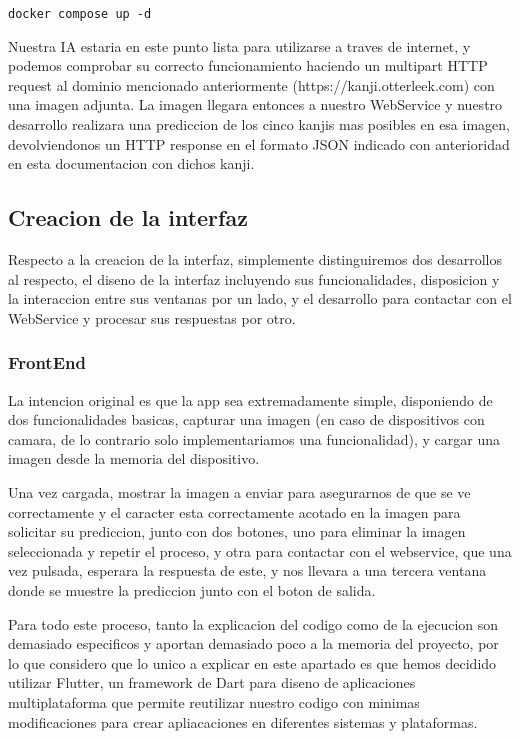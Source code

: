 \documentclass{article}
\begin{document}
\noindent\begin{minipage}{\textwidth}
\begin{lstlisting}[numbers=none]
docker compose up -d
\end{lstlisting}
\end{minipage}
Nuestra IA estaria en este punto lista para utilizarse a traves de internet, y podemos comprobar su correcto funcionamiento haciendo un multipart HTTP request al dominio mencionado anteriormente (https://kanji.otterleek.com) con una imagen adjunta. La imagen llegara entonces a nuestro WebService y nuestro desarrollo realizara una prediccion de los cinco kanjis mas posibles en esa imagen, devolviendonos un HTTP response en el formato JSON indicado con anterioridad en esta documentacion con dichos kanji.

\subsection{Creacion de la interfaz}

Respecto a la creacion de la interfaz, simplemente distinguiremos dos desarrollos al respecto, el diseno de la interfaz incluyendo sus funcionalidades, disposicion y la interaccion entre sus ventanas por un lado, y el desarrollo para contactar con el WebService y procesar sus respuestas por otro.

\subsubsection{FrontEnd}
La intencion original es que la app sea extremadamente simple, disponiendo de dos funcionalidades basicas, capturar una imagen (en caso de dispositivos con camara, de lo contrario solo implementariamos una funcionalidad), y cargar una imagen desde la memoria del dispositivo.

Una vez cargada, mostrar la imagen a enviar para asegurarnos de que se ve correctamente y el caracter esta correctamente acotado en la imagen para solicitar su prediccion, junto con dos botones, uno para eliminar la imagen seleccionada y repetir el proceso, y otra para contactar con el webservice, que una vez pulsada, esperara la respuesta de este, y nos llevara a una tercera ventana donde se muestre la prediccion junto con el boton de salida.

Para todo este proceso, tanto la explicacion del codigo como de la ejecucion son demasiado especificos y aportan demasiado poco a la memoria del proyecto, por lo que considero que lo unico a explicar en este apartado es que hemos decidido utilizar Flutter, un framework de Dart para diseno de aplicaciones multiplataforma que permite reutilizar nuestro codigo con minimas modificaciones para crear apliacaciones en diferentes sistemas y plataformas.
\end{document}
